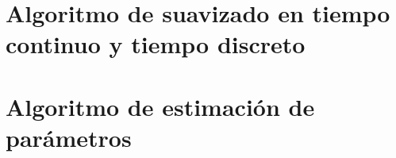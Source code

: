 \documentclass[
	spanish, %
	letterpaper, oneside
]{book}
\begin{document}
\chapter{Algoritmo de suavizado en tiempo continuo y tiempo discreto}


\chapter{Algoritmo de estimación de parámetros}





\end{document}
